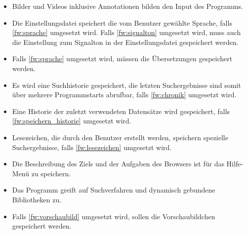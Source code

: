 \begin{itemize}
	\item Bilder und Videos inklusive Annotationen bilden den Input des Programms.
	\item Die Einstellungsdatei speichert die vom Benutzer gewählte Sprache, falls \ref{fw:sprache} umgesetzt wird. Falls \ref{fw:signalton} umgesetzt wird, muss auch die Einstellung zum Signalton in der Einstellungsdatei gespeichert werden.
	\item Falls \ref{fw:sprache} umgesetzt wird, müssen die Übersetzungen gespeichert werden.
	\item Es wird eine Suchhistorie gespeichert, die letzten Suchergebnisse sind somit über mehrere Programmstarts abrufbar, falls \ref{fw:chronik} umgesetzt wird. 
	\item Eine Historie der zuletzt verwendeten Datensätze wird gespeichert, falls \ref{fw:speichern_historie} umgesetzt wird.
	\item Lesezeichen, die durch den Benutzer erstellt werden, speichern spezielle Suchergebnisse, falls \ref{fw:lesezeichen} umgesetzt wird.
	\item Die Beschreibung des Ziels und der Aufgaben des Browsers ist für das Hilfe-Menü zu speichern.
	\item Das Programm greift auf Suchverfahren und dynamisch gebundene Bibliotheken zu.
	\item Falls \ref{fw:vorschaubild} umgesetzt wird, sollen die Vorschaubildchen gespeichert werden.
\end{itemize}
\pagebreak

